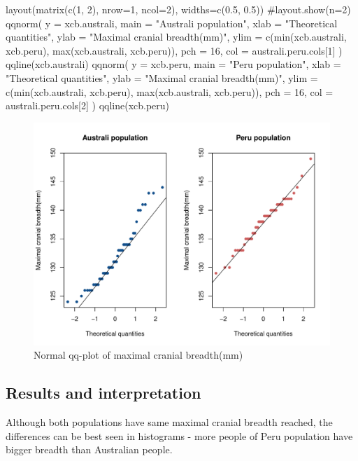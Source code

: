 \documentclass[12pt, oneside]{report}\usepackage[]{graphicx}\usepackage[]{color}
\begin{document}
\begin{Schunk}
\begin{Sinput}
layout(matrix(c(1, 2), nrow=1, ncol=2), widths=c(0.5, 0.5))
#layout.show(n=2)
qqnorm(
  y = xcb.australi, 
  main = "Australi population", 
  xlab = "Theoretical quantities", 
  ylab = "Maximal cranial breadth(mm)",
  ylim = c(min(xcb.australi, xcb.peru), max(xcb.australi, xcb.peru)),
  pch = 16,
  col = australi.peru.cols[1]
)
qqline(xcb.australi)
qqnorm(
  y = xcb.peru, 
  main = "Peru population", 
  xlab = "Theoretical quantities", 
  ylab = "Maximal cranial breadth(mm)",
  ylim = c(min(xcb.australi, xcb.peru), max(xcb.australi, xcb.peru)),
  pch = 16,
  col = australi.peru.cols[2]
)
qqline(xcb.peru)
\end{Sinput}
\begin{figure}[h]

{\centering \includegraphics[width=.6\textheight,height=.45\textheight]{figure/unnamed-chunk-7-1} 

}

\caption[Normal qq-plot of maximal cranial breadth(mm)]{Normal qq-plot of maximal cranial breadth(mm)}\label{fig:unnamed-chunk-7}
\end{figure}
\end{Schunk}

\newpage
\subsection*{Results and interpretation}

Although both populations have same maximal cranial breadth reached, the differences can be best seen in histograms - more people of 
Peru population have bigger breadth than Australian people. 
\end{document}
